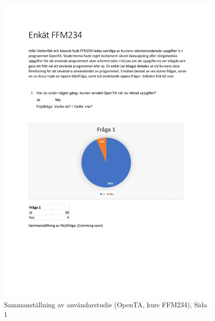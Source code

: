 

\begin{figure}[hbtp]
    \centering
    \includegraphics[page=1,scale=0.85]{appendix/form_survey.pdf}
    \caption*{Sammanställning av användarstudie (OpenTA, kurs FFM234), Sida 1}
    \label{fig:openform1}
\end{figure}


